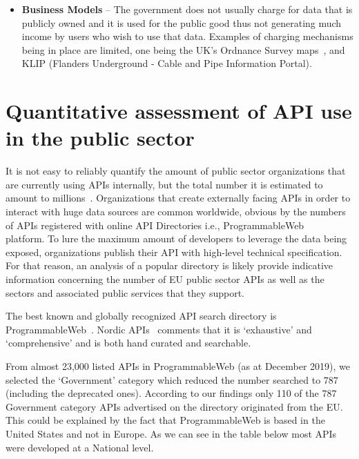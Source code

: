 \begin{itemize}
	\item \textbf{Business Models} – The government does not usually charge for data that is publicly owned and it is used for the public good thus not generating much income by users
	who wish to use that data. Examples of charging mechanisms being in place
	are	limited, one being the UK’s Ordnance Survey maps~\citep{os_places}, and KLIP
	(Flanders Underground - Cable and Pipe Information Portal).
\end{itemize}

\section{Quantitative assessment of API use in the public sector}

It is not easy to reliably quantify the amount of public sector organizations
that are currently using APIs internally, but the total number it is estimated to amount to millions~\citep{deloitte_insights}. Organizations
that create externally facing APIs in order to interact with huge data sources
are common worldwide, obvious by the numbers of APIs registered with online API Directories i.e., ProgrammableWeb ~\citep{programmableweb_apis} platform. To lure the maximum amount of developers to leverage the
data being exposed, organizations publish their API with high-level
technical specification. For that reason, an analysis of a popular
directory is likely provide indicative information concerning the number of EU
public sector APIs as well as the sectors and associated public services that they support.

The best known and globally recognized API search directory is ProgrammableWeb~\citep{programmableweb_search}.
Nordic APIs~\citep{nordic_apis} comments that it is ‘exhaustive’ and ‘comprehensive’ and is
both hand curated and searchable. 

From almost 23,000 listed APIs in ProgrammableWeb (as at December 2019),
we selected the ‘Government’ category which reduced the number searched to 787
(including the deprecated ones).
According to our findings only 110 of the 787
Government category APIs advertised on the directory originated from the EU.
This could be explained by the fact that ProgrammableWeb is based in the United States
and not in Europe. As we can see in the table below most APIs were developed at a National level.

